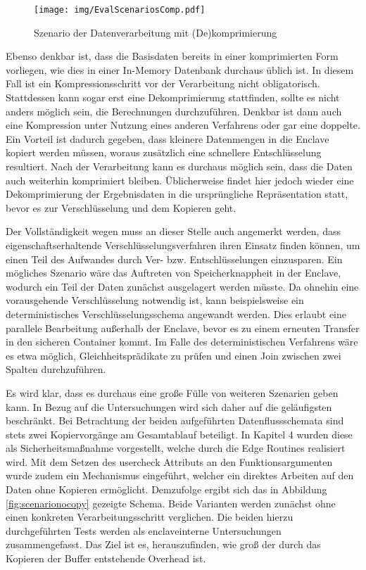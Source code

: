 \begin{figure}
	\texttt{[image: img/EvalScenariosComp.pdf]}
	\centering
	\caption{Szenario der Datenverarbeitung mit (De)komprimierung}
	\label{fig:scenariocomp}
\end{figure}

Ebenso denkbar ist, dass die Basisdaten bereits in einer komprimierten Form vorliegen, wie dies in einer In-Memory Datenbank durchaus üblich ist. In diesem Fall ist ein Kompressionsschritt vor der Verarbeitung nicht obligatorisch. Stattdessen kann sogar erst eine Dekomprimierung stattfinden, sollte es nicht anders möglich sein, die Berechnungen durchzuführen. Denkbar ist dann auch eine Kompression unter Nutzung eines anderen Verfahrens oder gar eine doppelte. Ein Vorteil ist dadurch gegeben, dass kleinere Datenmengen in die Enclave kopiert werden müssen, woraus zusätzlich eine schnellere Entschlüsselung resultiert. Nach der Verarbeitung kann es durchaus möglich sein, dass die Daten auch weiterhin komprimiert bleiben. Üblicherweise findet hier jedoch wieder eine Dekomprimierung der Ergebnisdaten in die ursprüngliche Repräsentation statt, bevor es zur Verschlüsselung und dem Kopieren geht.

Der Vollständigkeit wegen muss an dieser Stelle auch angemerkt werden, dass eigenschaftserhaltende Verschlüsselungsverfahren ihren Einsatz finden können, um einen Teil des Aufwandes durch Ver- bzw. Entschlüsselungen einzusparen. Ein mögliches Szenario wäre das Auftreten von Speicherknappheit in der Enclave, wodurch ein Teil der Daten zunächst ausgelagert werden müsste. Da ohnehin eine vorausgehende Verschlüsselung notwendig ist, kann beispielsweise ein deterministisches Verschlüsselungsschema angewandt werden. Dies erlaubt eine parallele Bearbeitung außerhalb der Enclave, bevor es zu einem erneuten Transfer in den sicheren Container kommt. Im Falle des deterministischen Verfahrens wäre es etwa möglich, Gleichheitsprädikate zu prüfen und einen Join zwischen zwei Spalten durchzuführen.

Es wird klar, dass es durchaus eine große Fülle von weiteren Szenarien geben kann. In Bezug auf die Untersuchungen wird sich daher auf die geläufigsten beschränkt. Bei Betrachtung der beiden aufgeführten Datenflussschemata sind stets zwei Kopiervorgänge am Gesamtablauf beteiligt. In Kapitel 4 wurden diese als Sicherheitsmaßnahme vorgestellt, welche durch die Edge Routines realisiert wird. Mit dem Setzen des user\textunderscore check Attributs an den Funktionsargumenten wurde zudem ein Mechanismus eingeführt, welcher ein direktes Arbeiten auf den Daten ohne Kopieren ermöglicht. Demzufolge ergibt sich das in Abbildung \ref{fig:scenarionocopy} gezeigte Schema. Beide Varianten werden zunächst ohne einen konkreten Verarbeitungsschritt verglichen. Die beiden hierzu durchgeführten Tests werden als enclaveinterne Untersuchungen zusammengefasst. Das Ziel ist es, herauszufinden, wie groß der durch das Kopieren der Buffer entstehende Overhead ist.

